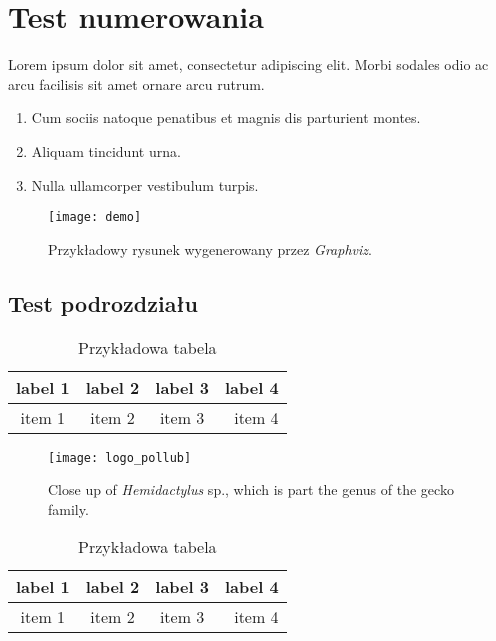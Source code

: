 \section{Test numerowania}

Lorem ipsum dolor sit amet, consectetur adipiscing elit.\cite{test1} Morbi sodales odio ac arcu facilisis sit amet ornare arcu rutrum.\cite{test1,test2}

\begin{enumerate}
  \item{Cum sociis natoque penatibus et magnis dis parturient montes.}
  \item{Aliquam tincidunt urna.}
  \item{Nulla ullamcorper vestibulum turpis.}
\end{enumerate}

\lipsum[2]

\begin{figure}[ht]
  \centering
  \texttt{[image: demo]}
  \caption[Przykładowy rysunek]%
  {Przykładowy rysunek wygenerowany przez \emph{Graphviz}.}
\end{figure}

\subsection{Test podrozdziału}

\lipsum[3]

\begin{table}[h]
  \center
  \caption{Przykładowa tabela}
  \label{my_table}
  \begin{tabular}{ | c | c | c | r | }
    \hline
  label 1 & label 2 & label 3 & label 4 \\
  \hline
  item 1  & item 2  & item 3  & item 4  \\
  \hline
  \end{tabular}
\end{table}

\lipsum[4]

\begin{figure}[ht]
  \centering
  \texttt{[image: logo\_pollub]}
  \caption[Close up of \textit{Hemidactylus} sp.]%
  {Close up of \textit{Hemidactylus} sp., which is
  part the genus of the gecko family.}
\end{figure}

\lipsum[5]

\begin{table}[h]
  \center
  \caption{Przykładowa tabela}
  \label{my_table}
  \begin{tabular}{ | c | c | c | r | }
    \hline
  label 1 & label 2 & label 3 & label 4 \\
  \hline
  item 1  & item 2  & item 3  & item 4  \\
  \hline
  \end{tabular}
\end{table}

